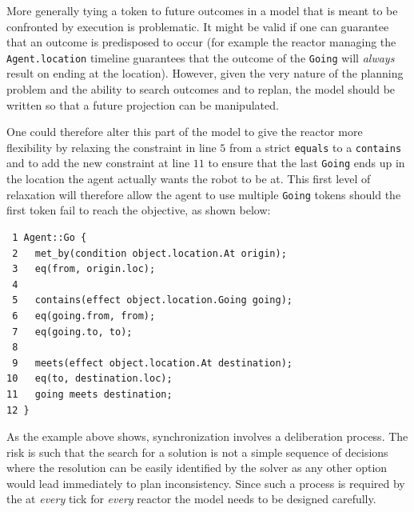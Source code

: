 More generally tying a token to future outcomes in a model that is
meant to be confronted by execution is problematic. It might be valid
if one can guarantee that an outcome is predisposed to occur (for
example the reactor managing the \texttt{Agent.location} timeline
guarantees that the outcome of the \texttt{Going} will {\em always}
result on ending at the  location). However, given
the very nature of the planning problem and the ability to search
outcomes and to replan, the model should be written so that a future
projection can be manipulated.

One could therefore alter this part of the model to give the reactor
more flexibility by relaxing the constraint in line $5$ from a strict
\texttt{equals} to a \texttt{contains} and to add the new constraint
at line $11$ to ensure that the last \texttt{Going} ends up in the
location the agent actually wants the robot to be at. This first level
of relaxation will therefore allow the agent to use multiple
\texttt{Going} tokens should the first token fail to reach the
objective, as shown below:

\begin{verbatim}
 1 Agent::Go {
 2   met_by(condition object.location.At origin);
 3   eq(from, origin.loc);
 4
 5   contains(effect object.location.Going going);
 6   eq(going.from, from);
 7   eq(going.to, to);
 8   
 9   meets(effect object.location.At destination);
10   eq(to, destination.loc);
11   going meets destination;
12 }
\end{verbatim}

As the example above shows, synchronization involves a deliberation
process. The risk is such that the search for a solution is not a
simple sequence of decisions where the resolution can be easily
identified by the solver as any other option would lead immediately to
plan inconsistency. Since such a process is required by the \rx at
\emph{every} tick for \emph{every} reactor the model needs to be
designed carefully.

